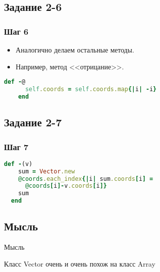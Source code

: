 \documentclass[compress,red]{beamer}
\begin{document}
\subsection{Задание 2-6}
\begin{frame}[fragile]
  \frametitle{Шаг 6}
  \begin{itemize}
    \item Аналогично делаем остальные методы. 
    \item Например, метод <<отрицание>>.
  \end{itemize}
  
  \scriptsize{
  \begin{lstlisting}[language=ruby,basicstyle=\footnotesize,label=ruby17,caption=Отрицание]
    def -@
      self.coords = self.coords.map{|i| -i}
    end
  \end{lstlisting}
  }
  
\end{frame}

\subsection{Задание 2-7}
\begin{frame}[fragile]
  \frametitle{Шаг 7}
  \scriptsize{
  \begin{lstlisting}[language=ruby,basicstyle=\footnotesize,label=ruby18,caption=Упрощение]
  def -(v)
    sum = Vector.new
    @coords.each_index{|i| sum.coords[i] = 
      @coords[i]-v.coords[i]}
    sum
  end    
  \end{lstlisting}
  }  
\end{frame}

\subsection{Мысль}
\begin{frame}
  \begin{center}
    \Huge{Мысль}
  \end{center}
  \begin{center}
    \Large{Класс Vector очень и очень похож на класс Array}
  \end{center}
\end{frame}
\end{document}
